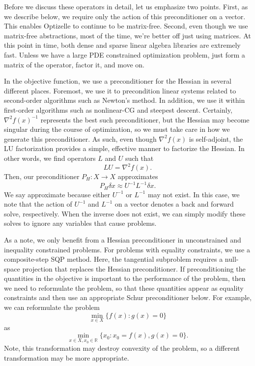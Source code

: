 \documentclass{report}
\newcommand{\re}{\mathbb{R}}
\begin{document}
        Before we discuss these operators in detail, let us emphasize two points.  First, as we describe below, we require only the action of this preconditioner on a vector.  This enables Optizelle to continue to be matrix-free.  Second, even though we use matrix-free abstractions, most of the time, we're better off just using matrices.  At this point in time, both dense and sparse linear algebra libraries are extremely fast.  Unless we have a large PDE constrained optimization problem, just form a matrix of the operator, factor it, and move on.
        
        In the objective function, we use a preconditioner for the Hessian in several different places.  Foremost, we use it to precondition linear systems related to second-order algorithms such as Newton's method.  In addition, we use it within first-order algorithms such as nonlinear-CG and steepest descent.  Certainly, $\nabla^2 f(x)^{-1}$ represents the best such preconditioner, but the Hessian may become singular during the course of optimization, so we must take care in how we generate this preconditioner.  As such, even though $\nabla^2 f(x)$ is self-adjoint, the LU factorization provides a simple, effective manner to factorize the Hessian.  In other words, we find operators $L$ and $U$ such that
$$
        LU=\nabla^2 f(x).
$$
Then, our preconditioner $P_H:X\rightarrow X$ approximates 
$$
        P_H\delta x \approx U^{-1}L^{-1} \delta x.
$$
We say approximate because either $U^{-1}$ or $L^{-1}$ may not exist.  In this case, we note that the action of $U^{-1}$ and $L^{-1}$ on a vector denotes a back and forward solve, respectively.  When the inverse does not exist, we can simply modify these solves to ignore any variables that cause problems.

        As a note, we only benefit from a Hessian preconditioner in unconstrained and inequality constrained problems.  For problems with equality constraints, we use a composite-step SQP method.  Here, the tangential subproblem requires a null-space projection that replaces the Hessian preconditioner.  If preconditioning the quantities in the objective is important to the performance of the problem, then we need to reformulate the problem, so that these quantities appear as equality constraints and then use an appropriate Schur preconditioner below.  For example, we can reformulate the problem
$$
        \min\limits_{x\in X}\{f(x) : g(x) = 0\}
$$
as
$$
        \min\limits_{x\in X,x_0\in \re}\{x_0 : x_0 = f(x), g(x) = 0\}.
$$
Note, this transformation may destroy convexity of the problem, so a different transformation may be more appropriate.
\end{document}
